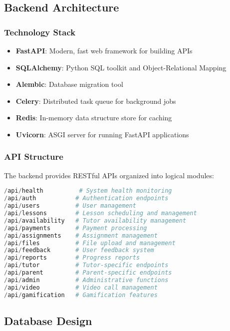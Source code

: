 \documentclass[11pt,a4paper]{article}
\begin{document}
\subsection{Backend Architecture}

\subsubsection{Technology Stack}
\begin{itemize}
    \item \textbf{FastAPI}: Modern, fast web framework for building APIs
    \item \textbf{SQLAlchemy}: Python SQL toolkit and Object-Relational Mapping
    \item \textbf{Alembic}: Database migration tool
    \item \textbf{Celery}: Distributed task queue for background jobs
    \item \textbf{Redis}: In-memory data structure store for caching
    \item \textbf{Uvicorn}: ASGI server for running FastAPI applications
\end{itemize}

\subsubsection{API Structure}
The backend provides RESTful APIs organized into logical modules:

\begin{lstlisting}[language=Python, caption=API Router Structure]
/api/health          # System health monitoring
/api/auth           # Authentication endpoints
/api/users          # User management
/api/lessons        # Lesson scheduling and management
/api/availability   # Tutor availability management
/api/payments       # Payment processing
/api/assignments    # Assignment management
/api/files          # File upload and management
/api/feedback       # User feedback system
/api/reports        # Progress reports
/api/tutor          # Tutor-specific endpoints
/api/parent         # Parent-specific endpoints
/api/admin          # Administrative functions
/api/video          # Video call management
/api/gamification   # Gamification features
\end{lstlisting}

\subsection{Database Design}
\end{document}
